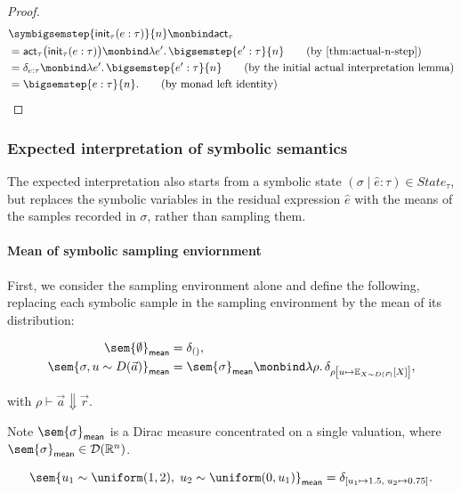 \begin{proof}
  \begin{align}
    &\symbigsemstep{\mathsf{init}_\tau(e:\tau)}{n}
    \monbind
    \mathsf{act}_\tau
    \notag
    \\
    &=
    \mathsf{act}_\tau\bigl(\mathsf{init}_\tau(e:\tau)\bigr)
    \monbind
    \lambda e'.\,\bigsemstep{e':\tau}{n}
    \tag{\text{by \Cref{thm:actual-n-step}}}
    \\
    &=
    \delta_{e:\tau}
    \monbind
    \lambda e'.\,\bigsemstep{e':\tau}{n}
    \tag{\text{by the initial actual interpretation lemma}}
    \\
    &=
    \bigsemstep{e:\tau}{n}.
    \tag{\text{by monad left identity}}
  \end{align}
\end{proof}

\subsubsection{Expected interpretation of symbolic semantics}

The expected interpretation also starts from a symbolic state
$(\sigma \mid \hat e : \tau) \in State_\tau$, but replaces the symbolic variables in the residual expression $\hat e$ with the means of the samples recorded in $\sigma$, rather than sampling them.

\paragraph{Mean of symbolic sampling enviornment}
First, we consider the sampling environment alone and define the following, replacing each symbolic sample in the sampling environment by the mean of its distribution:

\begin{align*}
  \sem{\emptyset}_{\mathsf{mean}}
  &=
  \delta_{()},\\
  \sem{\sigma,u\sim D(\vec a)}_{\mathsf{mean}}
  &=
  \sem{\sigma}_{\mathsf{mean}}
  \monbind
  \lambda\rho.\,
  \delta_{\rho\left[
  u\mapsto
  \mathbb{E}_{X\sim D(\vec r)}[X]
  \right]},
\end{align*}

with $\rho\vdash\vec a\Downarrow\vec r$. 

Note $\sem{\sigma}_{\mathsf{mean}}$ is a Dirac measure concentrated on a single valuation, where 
$\sem{\sigma}_{\mathsf{mean}} \in \mathcal{D}(\mathbb{R}^n)$.


\begin{example}
  \[
    \sem{
      u_1\sim\uniform(1,2),\;
      u_2\sim\uniform(0,u_1)
    }_{\mathsf{mean}}
    =
    \delta_{
      [u_1\mapsto 1.5,\;u_2\mapsto 0.75]
    }.
  \]
\end{example}


